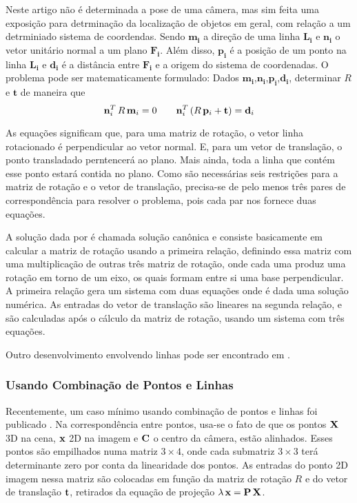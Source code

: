 Neste artigo não é determinada a pose de uma câmera, mas sim feita uma exposição para detrminação da localização de objetos em geral, com relação a um detrminiado sistema de coordendas. Sendo $\mathbf{m_i} $ a direção de uma linha $\mathbf{L_i} $ e $\mathbf{n_i} $ o vetor unitário normal a um plano $\mathbf{F_i} $. Além disso, $\mathbf{p_i} $ é a posição de um ponto na linha $\mathbf{L_i} $ e $\mathbf{d_i} $ é a distância entre $\mathbf{F_i} $ e a origem do sistema de coordenadas. O problema pode ser matematicamente formulado:
Dados $\mathbf{m_i} $,$\mathbf{n_i} $,$\mathbf{p_i} $,$\mathbf{d_i} $, determinar $ R $ e $ \mathbf{t} $ de maneira que 
\begin{equation*}
{\bf n}_i^{T}\,R\,{\bf m}_i = 0 \qquad {\bf n}_i^T\,(R\,{\bf p}_i+{\bf t}) = {\bf d}_i
\end{equation*}

As equações significam que, para uma matriz de rotação, o vetor linha rotacionado é perpendicular ao vetor normal. E, para um vetor de translação, o ponto transladado perntencerá ao plano. Mais ainda, toda a linha que contém esse ponto estará contida no plano. Como são necessárias seis restrições para a matriz de rotação e o vetor de translação, precisa-se de pelo menos três pares de correspondência para resolver o problema, pois cada par nos fornece duas equações.

A solução dada por \cite{chen} é chamada solução canônica e consiste basicamente em calcular a matriz de rotação usando a primeira relação, definindo essa matriz com uma multiplicação de outras três matriz de rotação, onde cada uma produz uma rotação em torno de um eixo, os quais formam entre si uma base perpendicular. A primeira relação gera um sistema com duas equações onde é dada uma solução numérica. As entradas do vetor de translação são lineares na segunda relação, e são calculadas após o cálculo da matriz de rotação, usando um sistema com três equações.

Outro desenvolvimento envolvendo linhas pode ser encontrado em \cite{dhome}.

\subsubsection{Usando Combinação de Pontos e Linhas}
Recentemente, um caso mínimo usando combinação de pontos e linhas foi publicado \cite{ramalingam}. Na correspondência entre pontos, usa-se o fato de que os pontos  ${\bf X}$ 3D na cena, ${\bf x}$ 2D na imagem e ${\bf C}$ o centro da câmera, estão alinhados. Esses pontos são empilhados numa matriz $3\times4$, onde cada submatriz $3\times3$ terá determinante zero por conta da linearidade dos pontos. As entradas do ponto 2D imagem nessa matriz são colocadas em função da matriz de rotação $R$ e do vetor de translação ${\bf t}$, retirados da equação de projeção $\lambda\,{\bf x}={\bf P}\,{\bf X}$.

